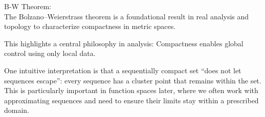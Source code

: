 \documentclass[12pt, letterpaper]{article}
\begin{document}
\begin{rmk}{B-W Theorem:}\\
The Bolzano–Weierstrass theorem is a foundational result in real analysis and topology to characterize compactness in metric spaces.

This highlights a central philosophy in analysis: Compactness enables global control using only local data.

One intuitive interpretation is that a sequentially compact set “does not let sequences escape”: every sequence has a cluster point that remains within the set. This is particularly important in function spaces later, where we often work with approximating sequences and need to ensure their limits stay within a prescribed domain.
\end{rmk}
\end{document}
